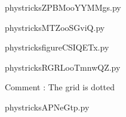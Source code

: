     

    \clearpage
    


    \newcommand{\CaptionFigZPBMooYYMMgs}{<+Type your caption here+>}
    \begin{center}
        
    \end{center}
    phystricksZPBMooYYMMgs.py

    

    \clearpage
    


    \newcommand{\CaptionFigMTZooSGviQ}{<+Type your caption here+>}
    \begin{center}
        
    \end{center}
    phystricksMTZooSGviQ.py

    

    \clearpage
    


    \newcommand{\CaptionFigfigureCSIQETx}{<+Type your caption here+>}
    \begin{center}
        
    \end{center}
    phystricksfigureCSIQETx.py

    

    \clearpage
    


    \newcommand{\CaptionFigRGRLooTmnwQZ}{<+Type your caption here+>}
    \begin{center}
        
    \end{center}
    phystricksRGRLooTmnwQZ.py

    Comment : The grid is dotted

    \clearpage
    


    \newcommand{\CaptionFigAPNeGtp}{<+Type your caption here+>}
    \begin{center}
        
    \end{center}
    phystricksAPNeGtp.py

    

    \clearpage
    


